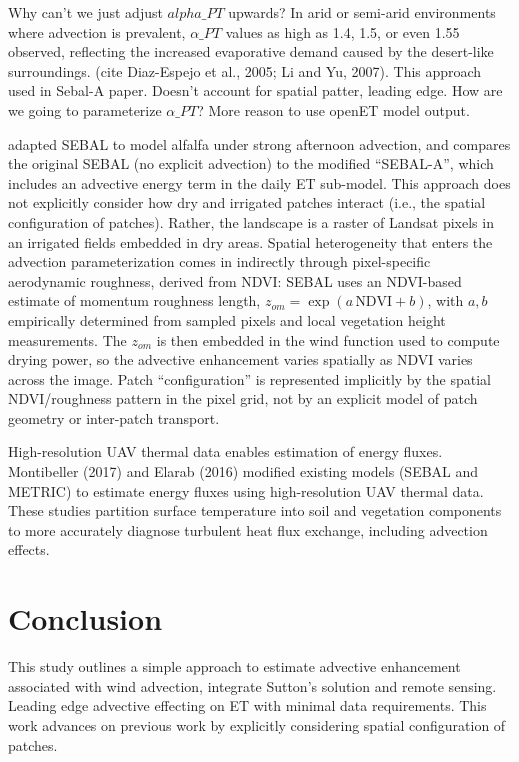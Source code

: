 \documentclass{article}
\begin{document}
    Why can't we just adjust $alpha\_{PT}$ upwards? 
     In arid or semi-arid environments where advection is prevalent, $\alpha\_{PT}$ values as high as 1.4, 1.5, or even 1.55 observed, reflecting the increased evaporative demand caused by the desert-like surroundings. (cite Diaz-Espejo et al., 2005; Li and Yu, 2007).
    This approach used in Sebal-A paper.
    Doesn't account for spatial patter, leading edge. How are we going to parameterize $\alpha\_{PT}$? More reason to use openET model output. 

    
    \citet{mkhwanazi2015sebal} adapted SEBAL to model alfalfa under strong afternoon advection, and  compares the original SEBAL (no explicit advection) to the modified ``SEBAL-A'', which includes an advective energy term  in the daily ET sub-model. 
    This approach does not explicitly consider how dry and irrigated patches interact (i.e., the spatial configuration of patches).  
    Rather, the landscape is a raster of Landsat pixels in an irrigated fields embedded in dry areas. 
    Spatial heterogeneity that  enters the advection parameterization comes in indirectly through pixel-specific aerodynamic roughness, derived from NDVI:  SEBAL uses an NDVI-based estimate of momentum roughness length, $z_{om} = \exp(a\,\text{NDVI} + b)$,  with $a, b$  empirically determined from sampled pixels and local vegetation height measurements. The $z_{om}$ is then embedded in the wind function used to compute drying power, so the advective enhancement varies spatially as NDVI varies across the image.
    Patch ``configuration'' is represented implicitly by the spatial NDVI/roughness pattern in the pixel grid, not by an explicit model of patch geometry or inter-patch transport.

    High-resolution UAV thermal data enables estimation of energy fluxes.
    Montibeller (2017) and Elarab (2016) modified existing models (SEBAL and METRIC) to estimate energy fluxes using high-resolution UAV thermal data. 
    These studies partition surface temperature into soil and vegetation components to more accurately diagnose turbulent heat flux exchange, including advection effects.

    
     
    
    \section{Conclusion}

    This study outlines a simple approach to estimate advective enhancement associated with wind advection, integrate Sutton's solution and remote sensing. 
    Leading edge advective effecting on ET with minimal data requirements.
    This work advances on previous work by explicitly considering spatial configuration of patches. 
\end{document}
